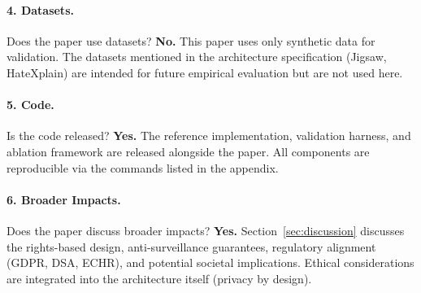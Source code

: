 \documentclass{article}
\begin{document}
\paragraph{4. Datasets.}
Does the paper use datasets?
\textbf{No.}
This paper uses only synthetic data for validation. The datasets
mentioned in the architecture specification (Jigsaw, HateXplain) are
intended for future empirical evaluation but are not used here.

\paragraph{5. Code.}
Is the code released?
\textbf{Yes.}
The reference implementation, validation harness, and ablation framework
are released alongside the paper. All components are reproducible via the
commands listed in the appendix.

\paragraph{6. Broader Impacts.}
Does the paper discuss broader impacts?
\textbf{Yes.}
Section~\ref{sec:discussion} discusses the rights-based design,
anti-surveillance guarantees, regulatory alignment (GDPR, DSA, ECHR),
and potential societal implications. Ethical considerations are
integrated into the architecture itself (privacy by design).
\end{document}
